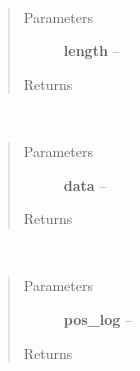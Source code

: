 \documentclass[letterpaper,10pt,english]{sphinxmanual}
\begin{document}

\begin{fulllineitems}
\label{index:aietes.Tools.randomstr}~\begin{quote}\begin{description}
\item[{Parameters}] \leavevmode
\textbf{length} -- 

\item[{Returns}] \leavevmode


\end{description}\end{quote}

\end{fulllineitems}


\begin{fulllineitems}
\label{index:aietes.Tools.range_grouper}~\begin{quote}\begin{description}
\item[{Parameters}] \leavevmode
\textbf{data} -- 

\item[{Returns}] \leavevmode


\end{description}\end{quote}

\end{fulllineitems}


\begin{fulllineitems}
\label{index:aietes.Tools.records_check}~\begin{quote}\begin{description}
\item[{Parameters}] \leavevmode
\textbf{pos\_log} -- 

\item[{Returns}] \leavevmode


\end{description}\end{quote}

\end{fulllineitems}
\end{document}
